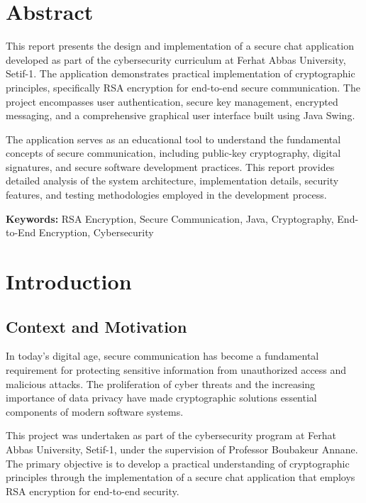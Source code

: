 \documentclass[12pt,a4paper]{article}
\begin{document}
\section*{Abstract}

This report presents the design and implementation of a secure chat application developed as part of the cybersecurity curriculum at Ferhat Abbas University, Setif-1. The application demonstrates practical implementation of cryptographic principles, specifically RSA encryption for end-to-end secure communication. The project encompasses user authentication, secure key management, encrypted messaging, and a comprehensive graphical user interface built using Java Swing.

The application serves as an educational tool to understand the fundamental concepts of secure communication, including public-key cryptography, digital signatures, and secure software development practices. This report provides detailed analysis of the system architecture, implementation details, security features, and testing methodologies employed in the development process.

\textbf{Keywords:} RSA Encryption, Secure Communication, Java, Cryptography, End-to-End Encryption, Cybersecurity

\newpage

\section{Introduction}

\subsection{Context and Motivation}

In today's digital age, secure communication has become a fundamental requirement for protecting sensitive information from unauthorized access and malicious attacks. The proliferation of cyber threats and the increasing importance of data privacy have made cryptographic solutions essential components of modern software systems.

This project was undertaken as part of the cybersecurity program at Ferhat Abbas University, Setif-1, under the supervision of Professor Boubakeur Annane. The primary objective is to develop a practical understanding of cryptographic principles through the implementation of a secure chat application that employs RSA encryption for end-to-end security.
\end{document}
